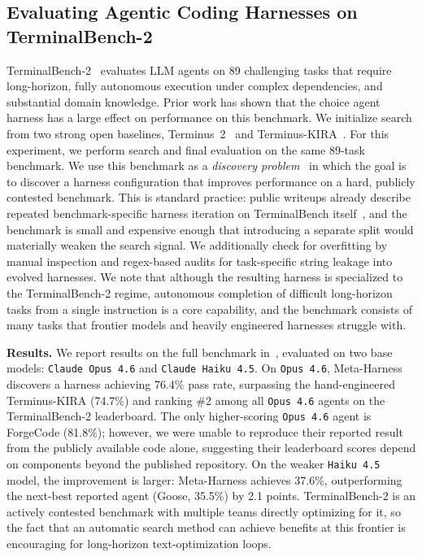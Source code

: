 \documentclass{article}
\begin{document}
\subsection{Evaluating Agentic Coding Harnesses on TerminalBench-2}
\label{subsec:terminalbench}

TerminalBench-2~\citep{merrill2026terminal} evaluates LLM agents on 89 challenging tasks that require long-horizon, fully autonomous execution under complex dependencies, and substantial domain knowledge.
Prior work has shown that the choice agent harness has a large effect on performance on this benchmark.
We initialize search from two strong open baselines, Terminus~2~\citep{merrill2026terminal} and Terminus-KIRA~\citep{terminuskira2026}.
For this experiment, we perform search and final evaluation on the same 89-task benchmark.
We use this benchmark as a \textit{discovery problem}~\citep{yuksekgonul2026learningdiscovertesttime} in which the goal is to discover a harness configuration that improves performance on a hard, publicly contested benchmark.
This is standard practice: public writeups already describe repeated benchmark-specific harness iteration on TerminalBench itself~\citep{forgecode_benchmarks_dont_matter,warp_terminal_bench,terminuskira2026}, and the benchmark is small and expensive enough that introducing a separate split would materially weaken the search signal.
We additionally check for overfitting by manual inspection and regex-based audits for task-specific string leakage into evolved harnesses.
We note that although the resulting harness is specialized to the TerminalBench-2 regime, autonomous completion of difficult long-horizon tasks from a single instruction is a core capability, and the benchmark consists of many tasks that frontier models and heavily engineered harnesses struggle with.


\textbf{Results.}
We report results on the full benchmark in~, evaluated on two base models: \texttt{Claude Opus 4.6} and \texttt{Claude Haiku 4.5}.
On \texttt{Opus 4.6}, Meta-Harness discovers a harness achieving 76.4\% pass rate, surpassing the hand-engineered Terminus-KIRA (74.7\%) and ranking \#2 among all \texttt{Opus 4.6} agents on the TerminalBench-2 leaderboard.
The only higher-scoring \texttt{Opus 4.6} agent is ForgeCode (81.8\%); however, we were unable to reproduce their reported result from the publicly available code alone, suggesting their leaderboard scores depend on components beyond the published repository.
On the weaker \texttt{Haiku 4.5} model, the improvement is larger: Meta-Harness achieves 37.6\%, outperforming the next-best reported agent (Goose, 35.5\%) by 2.1 points.
TerminalBench-2 is an actively contested benchmark with multiple teams directly optimizing for it, so the fact that an automatic search method can achieve benefits at this frontier is encouraging for long-horizon text-optimization loops.
\end{document}
